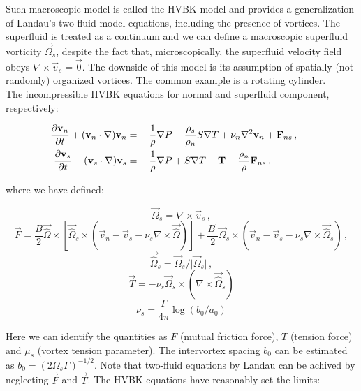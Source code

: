 Such macroscopic model is called the HVBK model and provides a generalization of Landau's two-fluid model equations, including the presence of vortices. The superfluid is treated as a continuum and we can define a macroscopic superfluid vorticity $\vec{\Omega}_s$, despite the fact that, microscopically, the superfluid velocity field obeys $\nabla \times \vec{v}_s = \vec{0}$. The downside of this model is its assumption of spatially (not randomly) organized vortices. The common example is a rotating cylinder.\\
The incompressible HVBK equations for normal and superfluid component, respectively:

\begin{align}
\frac{\partial\vec{v}_n}{\partial t} + (\vec{v}_n\cdot \nabla)\vec{v}_n =& -\frac{1}{\rho} \nabla P - \frac{\rho_s}{\rho_n} S \nabla T + \nu_n \nabla^2 \vec{v}_n + \vec{F}_{ns}\,,
\label{motion_normal}\\
\frac{\partial\vec{v}_s}{\partial t} + (\vec{v}_s\cdot \nabla)\vec{v}_s =& -\frac{1}{\rho} \nabla P + S \nabla T + \vec{T} - \frac{\rho_n}{\rho} \vec{F}_{ns}\,,
\hspace{15mm}
\label{motion_super}
\end{align}

where we have defined:

\begin{equation}
\vec{\Omega}_s = \nabla \times \vec{v}_s\,,
\end{equation}
\begin{equation}
\vec{F} = \frac{B}{2} \vec{\hat{\Omega}} \times [\vec{\hat{\Omega}}_s \times (\vec{v}_n - \vec{v}_s - \nu_s\nabla \times \vec{\hat{\Omega}})]
+ \frac{B^{\prime}}{2} \vec{\Omega}_s \times (\vec{v}_n - \vec{v}_s - \nu_s\nabla \times \vec{\hat{\Omega}}_s)\,,
\end{equation}
\begin{equation}
\vec{\hat{\Omega}}_s = \vec{\Omega}_s / \vert \vec{\Omega}_s \vert\,,
\end{equation}
\begin{equation}
\vec{T} = -\nu_s \vec{\Omega}_s \times (\nabla \times \vec{\hat{\Omega}}_s)
\end{equation}
\begin{equation}
\nu_s = \frac{\Gamma}{4\pi} \log(b_0 / a_0)
\end{equation}

Here we can identify the quantities as $F$ (mutual friction force), $T$ (tension force) and $\mu_s$ (vortex tension parameter). The intervortex spacing $b_0$ can be estimated as $b_0 = (2\Omega_s \Gamma)^{-1/2}$. Note that two-fluid equations by Landau can be achived by neglecting $\vec{F}$ and $\vec{T}$. The HVBK equations have reasonably set the limits:

